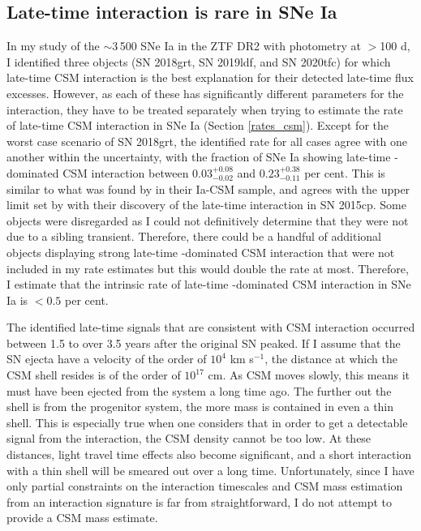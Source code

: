 \documentclass[a4paper,oneside,12pt, class=Latex/Classes/PhDthesisPSnPDF, crop=false]{standalone}
\begin{document}
\subsection{Late-time interaction is rare in SNe Ia}
\label{discuss_interaction}
In my study of the $\sim$3\,500 SNe Ia in the ZTF DR2 with photometry at $>$100 d, I identified three objects (SN 2018grt, SN 2019ldf, and SN 2020tfc) for which late-time CSM interaction is the best explanation for their detected late-time flux excesses. However, as each of these has significantly different parameters for the interaction, they have to be treated separately when trying to estimate the rate of late-time CSM interaction in SNe Ia (Section \ref{rates_csm}). Except for the worst case scenario of SN 2018grt, the identified rate for all cases agree with one another within the uncertainty, with the fraction of SNe Ia showing late-time \Halpha-dominated CSM interaction between $0.03^{+0.08}_{-0.02}$ and $0.23^{+0.38}_{-0.11}$ per cent. This is similar to what was found by \citet{Ia-CSM_BTS} in their Ia-CSM sample, and agrees with the upper limit set by \citet{2015cp} with their discovery of the late-time interaction in SN 2015cp. Some objects were disregarded as I could not definitively determine that they were not due to a sibling transient. Therefore, there could be a handful of additional objects displaying strong late-time \Halpha-dominated CSM interaction that were not included in my rate estimates but this would double the rate at most. Therefore, I estimate that the intrinsic rate of late-time \Halpha-dominated CSM interaction in SNe Ia is $<0.5$ per cent.

The identified late-time signals that are consistent with CSM interaction occurred between 1.5 to over 3.5 years after the original SN peaked. If I assume that the SN ejecta have a velocity of the order of $10^4$ km s$^{-1}$, the distance at which the CSM shell resides is of the order of $10^{17}$ cm. As CSM moves slowly, this means it must have been ejected from the system a long time ago. The further out the shell is from the progenitor system, the more mass is contained in even a thin shell. This is especially true when one considers that in order to get a detectable signal from the interaction, the CSM density cannot be too low. At these distances, light travel time effects also become significant, and a short interaction with a thin shell will be smeared out over a long time. Unfortunately, since I have only partial constraints on the interaction timescales and CSM mass estimation from an interaction signature is far from straightforward, I do not attempt to provide a CSM mass estimate.  
\end{document}
